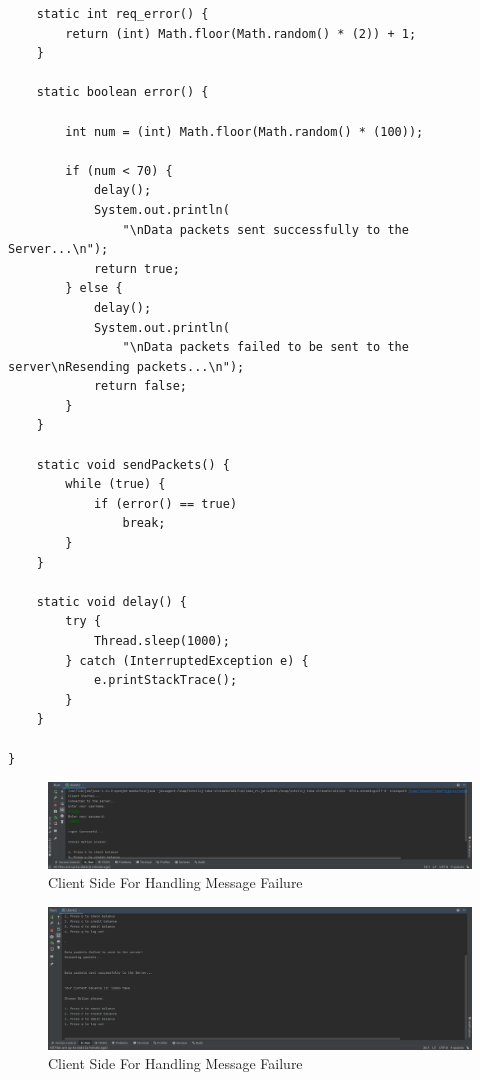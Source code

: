 \documentclass[11pt]{article}
\begin{document}
\begin{verbatim}
    static int req_error() {
        return (int) Math.floor(Math.random() * (2)) + 1;
    }

    static boolean error() {

        int num = (int) Math.floor(Math.random() * (100));

        if (num < 70) {
            delay();
            System.out.println(
                "\nData packets sent successfully to the Server...\n");
            return true;
        } else {
            delay();
            System.out.println(
                "\nData packets failed to be sent to the server\nResending packets...\n");
            return false;
        }
    }

    static void sendPackets() {
        while (true) {
            if (error() == true)
                break;
        }
    }

    static void delay() {
        try {
            Thread.sleep(1000);
        } catch (InterruptedException e) {
            e.printStackTrace();
        }
    }

}

\end{verbatim}
\begin{figure}[!h]
\centering
\includegraphics[width=\textwidth]{message1.png}
\caption{Client Side For Handling Message Failure}
\end{figure}
\begin{figure}[!h]
\centering
\includegraphics[width=\textwidth]{message2.png}
\caption{Client Side For Handling Message Failure}
\end{figure}
\end{document}
